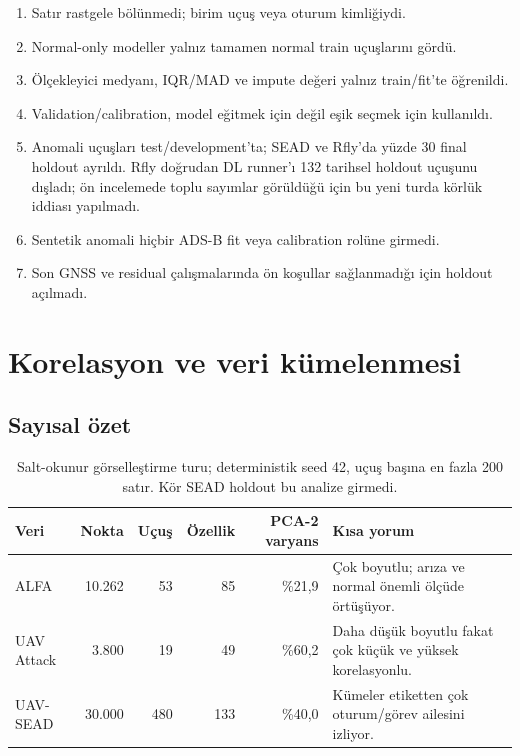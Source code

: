 \documentclass[10pt,a4paper]{article}
\begin{document}
\begin{enumerate}
  \item Satır rastgele bölünmedi; birim uçuş veya oturum kimliğiydi.
  \item Normal-only modeller yalnız tamamen normal train uçuşlarını gördü.
  \item Ölçekleyici medyanı, IQR/MAD ve impute değeri yalnız train/fit'te öğrenildi.
  \item Validation/calibration, model eğitmek için değil eşik seçmek için kullanıldı.
  \item Anomali uçuşları test/development'ta; SEAD ve Rfly'da yüzde 30 final holdout ayrıldı.
  Rfly doğrudan DL runner'ı 132 tarihsel holdout uçuşunu dışladı; ön incelemede toplu
  sayımlar görüldüğü için bu yeni turda körlük iddiası yapılmadı.
  \item Sentetik anomali hiçbir ADS-B fit veya calibration rolüne girmedi.
  \item Son GNSS ve residual çalışmalarında ön koşullar sağlanmadığı için holdout açılmadı.
\end{enumerate}

\section{Korelasyon ve veri kümelenmesi}

\subsection{Sayısal özet}

\begin{table}[ht]
\centering
\small
\begin{tabular}{lrrrrp{5.2cm}}
\toprule
\textbf{Veri} & \textbf{Nokta} & \textbf{Uçuş} & \textbf{Özellik} &
\textbf{PCA-2 varyans} & \textbf{Kısa yorum} \\
\midrule
ALFA & 10.262 & 53 & 85 & \%21,9 & Çok boyutlu; arıza ve normal önemli ölçüde örtüşüyor. \\
UAV Attack & 3.800 & 19 & 49 & \%60,2 & Daha düşük boyutlu fakat çok küçük ve yüksek korelasyonlu. \\
UAV-SEAD & 30.000 & 480 & 133 & \%40,0 & Kümeler etiketten çok oturum/görev ailesini izliyor. \\
\bottomrule
\end{tabular}
\caption{Salt-okunur görselleştirme turu; deterministik seed 42, uçuş başına en
fazla 200 satır. Kör SEAD holdout bu analize girmedi.}
\end{table}
\end{document}

